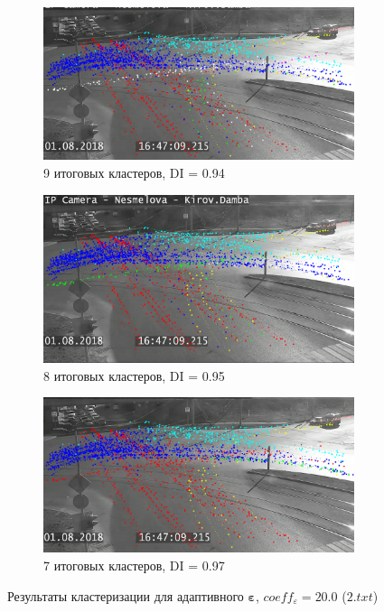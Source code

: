 \begin{figure}[!htb]
	\centering
	\begin{subfigure}[!htb]{0.8\textwidth}
		\centering{}
		\includegraphics[width=\textwidth]{images/9cl-di-94.png}
		\caption{9 итоговых кластеров, DI = 0.94}
		\label{fig:9cl-di-94}
	\end{subfigure}
	\hfill
	\begin{subfigure}[!htb]{0.8\textwidth}
		\centering{}
		\includegraphics[width=\textwidth]{images/8cl-di-95.png}
		\caption{8 итоговых кластеров, DI = 0.95}
		\label{fig:8cl-di-95}
	\end{subfigure}
	\hfill
	\begin{subfigure}[!htb]{0.8\textwidth}
		\centering{}
		\includegraphics[width=\textwidth]{images/7cl-di-97.png}
		\caption{7 итоговых кластеров, DI = 0.97}
		\label{fig:7cl-di-97}
	\end{subfigure}
	\caption{Результаты кластеризации для адаптивного $\bm{\varepsilon}$, $coeff_\varepsilon = 20.0$ ($2.txt$)}
	\label{fig:clust-res}
\end{figure}


